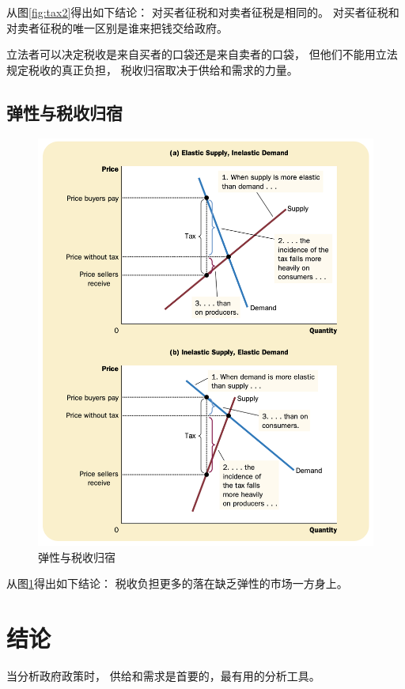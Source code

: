 从图\ref{fig:tax2}得出如下结论：
对买者征税和对卖者征税是相同的。
对买者征税和对卖者征税的唯一区别是谁来把钱交给政府。




立法者可以决定税收是来自买者的口袋还是来自卖者的口袋，
但他们不能用立法规定税收的真正负担，
税收归宿取决于供给和需求的力量。



\subsection{弹性与税收归宿}


\begin{figure}[!ht]
  \centering
  \includegraphics[width=\textwidth]{pics/tax3}
  \caption{弹性与税收归宿}
  \label{fig:tax3}
\end{figure}

从图\ref{fig:tax3}得出如下结论：
税收负担更多的落在缺乏弹性的市场一方身上。


\section{结论}

当分析政府政策时，
供给和需求是首要的，最有用的分析工具。
